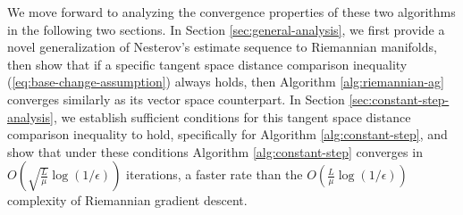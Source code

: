 We move forward to analyzing the convergence properties of these two algorithms in the following two sections. In Section \ref{sec:general-analysis}, we first provide a novel generalization of Nesterov's estimate sequence to Riemannian manifolds, then show that if a specific tangent space distance comparison inequality (\ref{eq:base-change-assumption}) always holds, then Algorithm \ref{alg:riemannian-ag} converges similarly as its vector space counterpart. In Section \ref{sec:constant-step-analysis}, we establish sufficient conditions for this tangent space distance comparison inequality to hold, specifically for Algorithm \ref{alg:constant-step}, and show that under these conditions Algorithm \ref{alg:constant-step} converges in $O\left(\sqrt{\frac{L}{\mu}}\log(1/\epsilon)\right)$ iterations, a faster rate than the $O\left(\frac{L}{\mu}\log(1/\epsilon)\right)$ complexity of Riemannian gradient descent.


